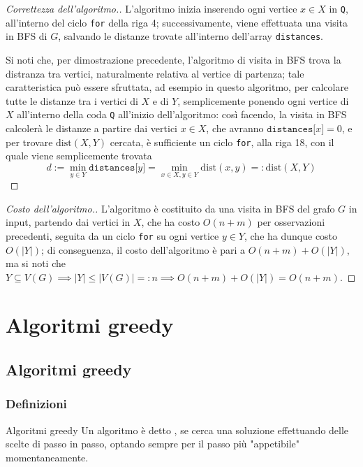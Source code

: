 \documentclass[a4paper, 12pt]{report}
\begin{document}
    \begin{proof}[Correttezza dell'algoritmo.]
        L'algoritmo inizia inserendo ogni vertice $x \in X$ in \texttt{Q}, all'interno del ciclo \texttt{for} della riga 4; successivamente, viene effettuata una visita in BFS di $G$, salvando le distanze trovate all'interno dell'array \texttt{distances}.

        Si noti che, per dimostrazione precedente, l'algoritmo di visita in BFS trova la distranza tra vertici, naturalmente relativa al vertice di partenza; tale caratteristica può essere sfruttata, ad esempio in questo algoritmo, per calcolare tutte le distanze tra i vertici di $X$ e di $Y$, semplicemente ponendo ogni vertice di $X$ all'interno della coda \texttt{Q} all'inizio dell'algoritmo: così facendo, la visita in BFS calcolerà le distanze a partire dai vertici $x \in X$, che avranno $\texttt{distances[}x\texttt{]} = 0$, e per trovare $\mathrm{dist}(X, Y)$ cercata, è sufficiente un ciclo \texttt{for}, alla riga 18, con il quale viene semplicemente trovata $$\displaystyle d := \min_{y \in Y}{\texttt{distances[}y\texttt{]}} = \min_{x \in X, y \in Y}{\mathrm{dist}(x, y)} =: \mathrm{dist}(X, Y)$$
    \end{proof}

    \begin{proof}[Costo dell'algoritmo.]
        L'algoritmo è costituito da una visita in BFS del grafo $G$ in input, partendo dai vertici in $X$, che ha costo $O(n + m)$ per osservazioni precedenti, seguita da un ciclo \texttt{for} su ogni vertice $y \in Y$, che ha dunque costo $O(|Y|)$; di conseguenza, il costo dell'algoritmo è pari a $O(n + m) + O(|Y|)$, ma si noti che $Y \subseteq V(G) \implies |Y| \le |V(G)| =: n \implies O(n + m) + O(|Y|) = O(n + m)$.
    \end{proof}

    \chapter{Algoritmi greedy}

    \section{Algoritmi greedy}

    \subsection{Definizioni}

    \begin{frameddefn}{Algoritmi greedy}
        Un algoritmo è detto , se cerca una soluzione effettuando delle scelte di passo in passo, optando sempre per il passo più "appetibile" momentaneamente.
    \end{frameddefn}
\end{document}
